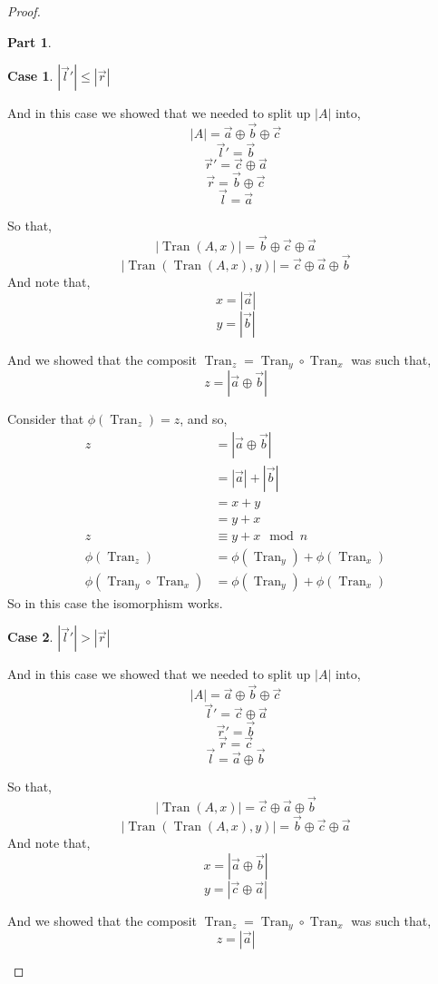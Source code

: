 \documentclass[12pt]{book}
\theoremstyle{plain}
\theoremstyle{definition}
\theoremstyle{ppart}
\newtheorem{ppart}{Part}
\theoremstyle{case}
\newtheorem{case}{Case}
\theoremstyle{solution}
\DeclareMathOperator{\Tran}{Tran}
\newcommand{\shape}[1]{\left|#1\right|}
\begin{document}
\begin{proof}
\begin{ppart}
\setcounter{case}{0}
\begin{case} $\shape{\vec{l}'} \le \shape{\vec{r}}$

And in this case we showed that we needed to split up $\shape{A}$ into,
\[ \shape{A} = \vec{a} \oplus \vec{b} \oplus \vec{c} \]
\[ \vec{l}' = \vec{b} \]
\[ \vec{r}' = \vec{c} \oplus \vec{a} \]
\[ \vec{r} = \vec{b} \oplus \vec{c} \]
\[ \vec{l} = \vec{a} \]

So that,
\[ \shape{\Tran(A, x)} = \vec{b} \oplus \vec{c} \oplus \vec{a} \]
\[ \shape{\Tran(\Tran(A, x), y)} = \vec{c} \oplus \vec{a} \oplus \vec{b} \]
And note that,
\[ x = \shape{\vec{a}} \]
\[ y = \shape{\vec{b}} \]

And we showed that the composit $\Tran_z = \Tran_y \circ \Tran_x$ was such
that,
\[ z = \shape{\vec{a} \oplus \vec{b}} \]

Consider that $\phi(\Tran_z) = z$, and so,
\begin{align*}
  z
  &= \shape{\vec{a} \oplus \vec{b}} \\
  &= \shape{\vec{a}} + \shape{\vec{b}} \\
  &= x + y \\
  &= y + x \\
  z &\equiv y + x \mod n \\
  \phi(\Tran_z) &= \phi(\Tran_y) + \phi(\Tran_x) \\
  \phi(\Tran_y \circ \Tran_x) &= \phi(\Tran_y) + \phi(\Tran_x)
\end{align*}
So in this case the isomorphism works.
\end{case}

\begin{case} $\shape{\vec{l}'} > \shape{\vec{r}}$

And in this case we showed that we needed to split up $\shape{A}$ into,
\[ \shape{A} = \vec{a} \oplus \vec{b} \oplus \vec{c} \]
\[ \vec{l}' = \vec{c} \oplus \vec{a} \]
\[ \vec{r}' = \vec{b} \]
\[ \vec{r} = \vec{c} \]
\[ \vec{l} = \vec{a} \oplus \vec{b} \]

So that,
\[ \shape{\Tran(A, x)} = \vec{c} \oplus \vec{a} \oplus \vec{b} \]
\[ \shape{\Tran(\Tran(A, x), y)} = \vec{b} \oplus \vec{c} \oplus \vec{a} \]
And note that,
\[ x = \shape{\vec{a} \oplus \vec{b}} \]
\[ y = \shape{\vec{c} \oplus \vec{a}} \]

And we showed that the composit $\Tran_z = \Tran_y \circ \Tran_x$ was such
that,
\[ z = \shape{\vec{a}} \]


\end{case}
\end{ppart}
\end{proof}
\end{document}
